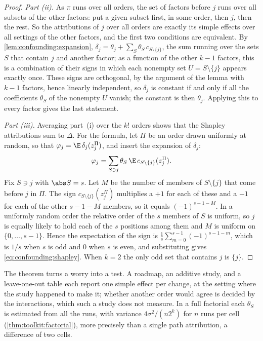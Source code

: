 \begin{refsection}
\begin{proof}
\emph{Part (ii).} As $\pi$ runs over all orders, the set of factors before $j$ runs over all subsets of the other factors: put a given subset first, in some order, then $j$, then the rest. So the attributions of $j$ over all orders are exactly its simple effects over all settings of the other factors, and the first two conditions are equivalent. By \cref{lem:confounding:expansion}, $\delta_j=\theta_j+\sum_S\theta_S\,c_{S\setminus\{j\}}$, the sum running over the sets $S$ that contain $j$ and another factor; as a function of the other $k-1$ factors, this is a combination of their signs in which each nonempty set $U=S\setminus\{j\}$ appears exactly once. These signs are orthogonal, by the argument of the lemma with $k-1$ factors, hence linearly independent, so $\delta_j$ is constant if and only if all the coefficients $\theta_S$ of the nonempty $U$ vanish; the constant is then $\theta_j$. Applying this to every factor gives the last statement.

\emph{Part (iii).} Averaging part~(i) over the $k!$ orders shows that the Shapley attributions sum to $\Delta$. For the formula, let $\Pi$ be an order drawn uniformly at random, so that $\varphi_j=\E\,\delta_j(z^\Pi_j)$, and insert the expansion of $\delta_j$:
\[
\varphi_j=\sum_{S\ni j}\theta_S\,\E\,c_{S\setminus\{j\}}(z^\Pi_j).
\]
Fix $S\ni j$ with $\abs S=s$. Let $M$ be the number of members of $S\setminus\{j\}$ that come before $j$ in $\Pi$. The sign $c_{S\setminus\{j\}}(z^\Pi_j)$ multiplies a $+1$ for each of these and a $-1$ for each of the other $s-1-M$ members, so it equals $(-1)^{s-1-M}$. In a uniformly random order the relative order of the $s$ members of $S$ is uniform, so $j$ is equally likely to hold each of the $s$ positions among them and $M$ is uniform on $\{0,\dots,s-1\}$. Hence the expectation of the sign is $\frac1s\sum_{m=0}^{s-1}(-1)^{s-1-m}$, which is $1/s$ when $s$ is odd and $0$ when $s$ is even, and substituting gives \eqref{eq:confounding:shapley}. When $k=2$ the only odd set that contains $j$ is $\{j\}$.
\end{proof}

The theorem turns a worry into a test. A roadmap, an additive study, and a leave-one-out table each report one simple effect per change, at the setting where the study happened to make it; whether another order would agree is decided by the interactions, which such a study does not measure. In a full factorial each $\theta_S$ is estimated from all the runs, with variance $4\sigma^2/(n2^k)$ for $n$ runs per cell (\cref{thm:toolkit:factorial}), more precisely than a single path attribution, a difference of two cells.


\end{refsection}
